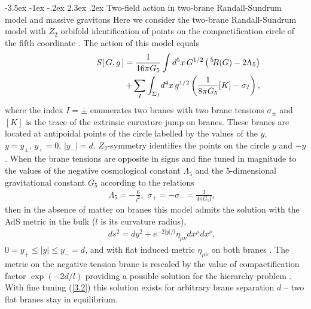 \documentclass[a4paper,12pt]{article}
\makeatletter
\renewcommand\section{\@startsection {section}{1}{\z@}%
                                   {-3.5ex \@plus -1ex \@minus -.2ex}%
                                   {2.3ex \@plus.2ex}%
                                   {\normalfont\large\bfseries}}
\makeatother
\begin{document}
\section{Two-field action in two-brane Randall-Sundrum
model and massive gravitons} \label{sec:2} Here we consider the
two-brane Randall-Sundrum model with $Z_2$ orbifold identification
of points on the compactification circle of the fifth coordinate
\cite{RSloc}. The action of this model equals
     \begin{eqnarray}
     &&S[\,G,g\,]=\frac1{16\pi G_5}
     \int d^5x\,G^{1/2}
     \left(\,\vphantom{I}^5\!R(G)-2\Lambda_5\right)
     \nonumber\\
     &&\qquad\qquad\qquad\qquad
     +\sum\limits_{I}\int_{\Sigma_I}\!
     d^4x\,g^{1/2}\left(
     \frac1{8\pi G_5}[K]-\sigma_I\right), \label{0.1}
     \end{eqnarray}
where the index $I=\pm$ enumerates two branes with two brane
tensions $\sigma_\pm$ and $[K]$ is the trace of the extrinsic
curvature jump on branes. These branes are located
at antipoidal points of the circle labelled by the values of the
$y$, $y=y_\pm,\,y_+=0,\,|y_-|=d$. $Z_2$-symmetry identifies the
points on the circle $y$ and $-y$. When the brane tensions are
opposite in signs and fine tuned in magnitude to the values of the
negative cosmological constant $\Lambda_5$ and the 5-dimensional
gravitational constant $G_5$ according to the relations
     \begin{eqnarray}
     &&\Lambda_5=-\frac6{l^2},\,\,
     \sigma_+=-\sigma_-=\frac3{4\pi G_5l},   \label{3.2}
     \end{eqnarray}
then in the absence of matter on branes this model admits the
solution with the AdS metric in the bulk ($l$ is its curvature
radius),
     \begin{eqnarray}
     &&ds^2=dy^2+e^{-2|y|/l}\eta_{\mu\nu}dx^\mu dx^\nu,
     \end{eqnarray}
$0=y_+\leq|y|\leq y_-=d$, and with flat induced metric
$\eta_{\mu\nu}$ on both branes \cite{RSloc}. The metric on the
negative tension brane is rescaled by the value of
compactification factor $\exp(-2d/l)$ providing a possible
solution for the hierarchy problem \cite{RShier}. With fine tuning
(\ref{3.2}) this solution exists for arbitrary brane separation
$d$ -- two flat branes stay in equilibrium.
\end{document}
